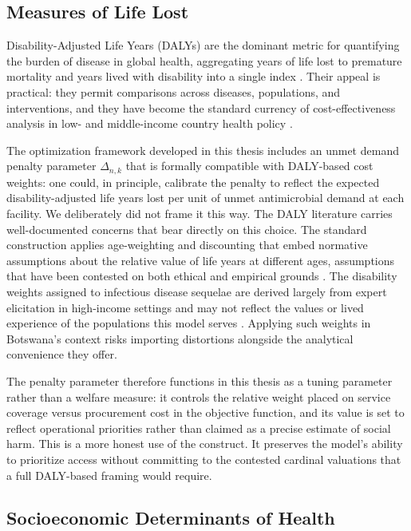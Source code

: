 \documentclass{article}
\begin{document}
\subsection{Measures of Life Lost}

Disability-Adjusted Life Years (DALYs) are the dominant metric for quantifying the burden of disease in global health, aggregating years of life lost to premature mortality and years lived with disability into a single index \cite{murray1994}. Their appeal is practical: they permit comparisons across diseases, populations, and interventions, and they have become the standard currency of cost-effectiveness analysis in low- and middle-income country health policy \cite{voigt2012}.

The optimization framework developed in this thesis includes an unmet demand penalty parameter $\Delta_{n,k}$ that is formally compatible with DALY-based cost weights: one could, in principle, calibrate the penalty to reflect the expected disability-adjusted life years lost per unit of unmet antimicrobial demand at each facility. We deliberately did not frame it this way. The DALY literature carries well-documented concerns that bear directly on this choice. The standard construction applies age-weighting and discounting that embed normative assumptions about the relative value of life years at different ages, assumptions that have been contested on both ethical and empirical grounds \cite{arne99}. The disability weights assigned to infectious disease sequelae are derived largely from expert elicitation in high-income settings and may not reflect the values or lived experience of the populations this model serves \cite{voigt2012}. Applying such weights in Botswana's context risks importing distortions alongside the analytical convenience they offer.

The penalty parameter therefore functions in this thesis as a tuning parameter rather than a welfare measure: it controls the relative weight placed on service coverage versus procurement cost in the objective function, and its value is set to reflect operational priorities rather than claimed as a precise estimate of social harm. This is a more honest use of the construct. It preserves the model's ability to prioritize access without committing to the contested cardinal valuations that a full DALY-based framing would require.

\subsection{Socioeconomic Determinants of Health}
\end{document}
